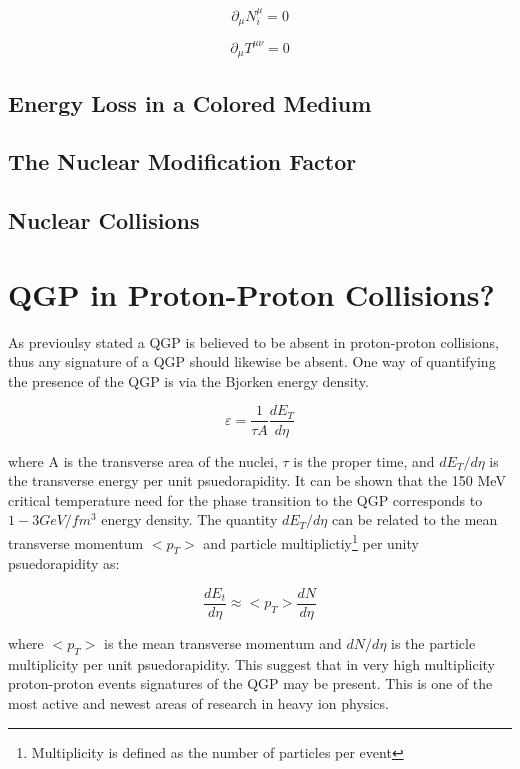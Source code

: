 \begin{equation}
\partial_{\mu} N_{\textit{i}}^{\mu} = 0
\label{eq:hydrochrg}
\end{equation}

\begin{equation}
\partial_{\mu} T^{\mu \nu} = 0
\label{eq:hydroenrgy}
\end{equation}

\subsection{Energy Loss in a Colored Medium}

\subsection{The Nuclear Modification Factor}

\subsection{Nuclear Collisions}


\section{QGP in Proton-Proton Collisions?}
As previoulsy stated a QGP is believed to be absent in proton-proton collisions, thus any signature of a QGP should likewise be absent.  One way of quantifying the presence of the QGP is via the Bjorken energy density.  

\begin{equation}
\varepsilon = \frac{1}{\tau A} \frac{dE_{T}}{d \eta}
\label{eq:bjorkenEt}
\end{equation}

\noindent
where A is the transverse area of the nuclei, $\tau$ is the proper time, and $dE_{T}/d \eta$ is the transverse energy per unit psuedorapidity.  It can be shown that  the 150 MeV critical temperature need for the phase transition to the QGP corresponds to ~ $1 - 3 GeV/fm^{3}$ energy density.  The quantity $dE_{T}/d \eta$ can be related to the mean transverse momentum $<p_{T}>$ and particle multiplictiy\footnote{Multiplicity is defined as the number of particles per event} per unity psuedorapidity as:

\begin{equation}
\frac{dE_{t}}{d \eta}  \approx  <p_{T}> \frac{dN}{d\eta}
\label{eq:Et}
\end{equation}

where $ <p_{T} >$ is the mean transverse momentum and $dN/d\eta$ is the particle multiplicity per unit psuedorapidity.
This suggest that in very high multiplicity proton-proton events signatures of the QGP may be present.  This is one of the most active and newest areas of research in heavy ion physics.  